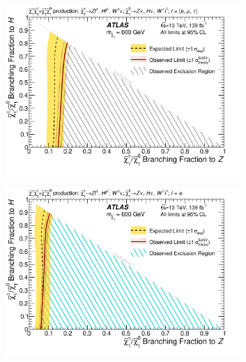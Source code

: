 \begin{figure}[ht]
    \centering
    \begin{subfigure}[b]{0.49\textwidth}
      \centering
      \includegraphics[width=0.98\textwidth]{figs/rpvthreel/triangleLimits_bre_33_brm_33_brt_33_mass_600.png}
      \caption{}
      \label{fig:triangle_democratic}
    \end{subfigure}
    \hfill
    \begin{subfigure}[b]{0.49\textwidth}
      \centering
      \includegraphics[width=0.98\textwidth]{figs/rpvthreel/triangleLimits_bre_100_brm_0_brt_0_mass_600.png}
      \caption{}
      \label{fig:trianlge_100e}
    \end{subfigure}
    \hfill
    \begin{subfigure}[b]{0.49\textwidth}
      \centering

\end{subfigure}
\end{figure}
